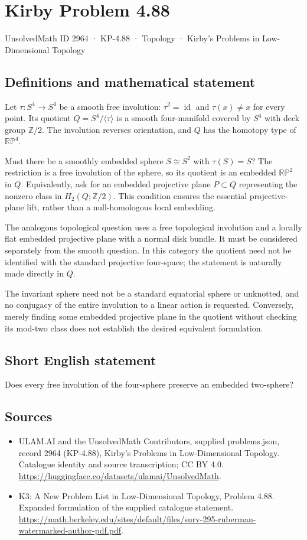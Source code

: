 \documentclass[11pt,a4paper]{article}
\begin{document}
\section*{Kirby Problem 4.88}\label{2964}
{\small UnsolvedMath ID 2964 · KP-4.88 · Topology · Kirby's Problems in Low-Dimensional Topology}
\subsection{Definitions and mathematical statement}
Let $\tau:S^4\to S^4$ be a smooth free involution: $\tau^2=\operatorname{id}$ and $\tau(x)\ne x$ for every point. Its quotient $Q=S^4/\langle\tau\rangle$ is a smooth four-manifold covered by $S^4$ with deck group $\mathbb Z/2$. The involution reverses orientation, and $Q$ has the homotopy type of $\mathbb{RP}^4$.

Must there be a smoothly embedded sphere $S\cong S^2$ with $\tau(S)=S$? The restriction is a free involution of the sphere, so its quotient is an embedded $\mathbb{RP}^2$ in $Q$. Equivalently, ask for an embedded projective plane $P\subset Q$ representing the nonzero class in $H_2(Q;\mathbb Z/2)$. This condition ensures the essential projective-plane lift, rather than a null-homologous local embedding.

The analogous topological question uses a free topological involution and a locally flat embedded projective plane with a normal disk bundle. It must be considered separately from the smooth question. In this category the quotient need not be identified with the standard projective four-space; the statement is naturally made directly in $Q$.

The invariant sphere need not be a standard equatorial sphere or unknotted, and no conjugacy of the entire involution to a linear action is requested. Conversely, merely finding some embedded projective plane in the quotient without checking its mod-two class does not establish the desired equivalent formulation.
\subsection{Short English statement}
Does every free involution of the four-sphere preserve an embedded two-sphere?
\subsection{Sources}
\begin{itemize}
\item[S1] ULAM.AI and the UnsolvedMath Contributors, supplied problems.json, record 2964 (KP-4.88), Kirby's Problems in Low-Dimensional Topology. Catalogue identity and source transcription; CC BY 4.0.
\url{https://huggingface.co/datasets/ulamai/UnsolvedMath}.
\item[S2] K3: A New Problem List in Low-Dimensional Topology, Problem 4.88. Expanded formulation of the supplied catalogue statement.
\url{https://math.berkeley.edu/sites/default/files/surv-295-ruberman-watermarked-author-pdf.pdf}.
\end{itemize}
\end{document}
